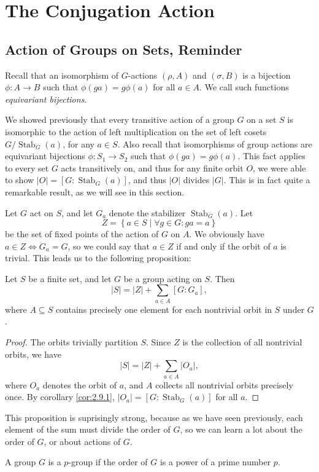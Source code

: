 \section{The Conjugation Action}
\subsection{Action of Groups on Sets, Reminder}
Recall that an isomorphism of $G$-actions $(\rho ,A)$ and $(\sigma ,B)$ is a bijection $\phi :A\to B$ such that $\phi (ga)=g\phi (a)$ for all $a\in A$. We call such functions \emph{equivariant bijections}.

We showed previously that every transitive action of a group $G$ on a set $S$ is isomorphic to the action of left multiplication on the set of left cosets $G / \operatorname{Stab}_G(a) $, for any $a\in S$. Also recall that isomorphisms of group actions are equivariant bijections $\phi : S_1 \to S_2$ such that $\phi (ga)=g\phi (a)$. This fact applies to every set $G$ acts transitively on, and thus for any finite orbit $O$, we were able to show $\left| O \right| =[G: \operatorname{Stab}_G(a) ]$, and thus $\left| O \right| $ divides $\left| G \right| $. This is in fact quite a remarkable result, as we will see in this section.

Let $G$ act on $S$, and let $G_a$ denote the stabilizer $\operatorname{Stab}_G(a)$. Let
\[
	Z=\left\{ a\in S\mid \forall g\in G: ga=a \right\} 
\]
be the set of fixed points of the action of $G$ on $A$. We obviously have $a\in Z \iff G_a=G$, so we could say that $a\in Z$ if and only if the orbit of $a$ is trivial. This leads us to the following proposition:
\begin{proposition}\label{prp:4.1.1}
	Let $S$ be a finite set, and let $G$ be a group acting on $S$. Then
	\[
		\left| S \right| =\left| Z \right| + \sum_{a\in A} [G : G_a]
	,\]
	where $A\subseteq S$ contains precisely one element for each nontrivial orbit in $S$ under $G$.
\end{proposition}
\begin{proof}
	The orbits trivially partition $S$. Since $Z$ is the collection of all nontrivial orbits, we have
	\[
		\left| S \right| =\left| Z \right| +\sum_{a\in A} \left| O_a \right| 
	,\]
	where $O_a$ denotes the orbit of $a$, and $A$ collects all nontrivial orbits precisely once. By corollary \ref{cor:2.9.1}, $\left| O_a \right| =[G : \operatorname{Stab}_G(a)]$ for all $a$.
\end{proof}

This proposition is suprisingly strong, because as we have seen previously, each element of the sum must divide the order of $G$, so we can learn a lot about the order of $G$, or about actions of $G$.
\begin{definition}[$p$-Group]\label{dfn:4.1.1}
	A group $G$ is a $p$-group if the order of $G$ is a power of a prime number $p$.
\end{definition}

